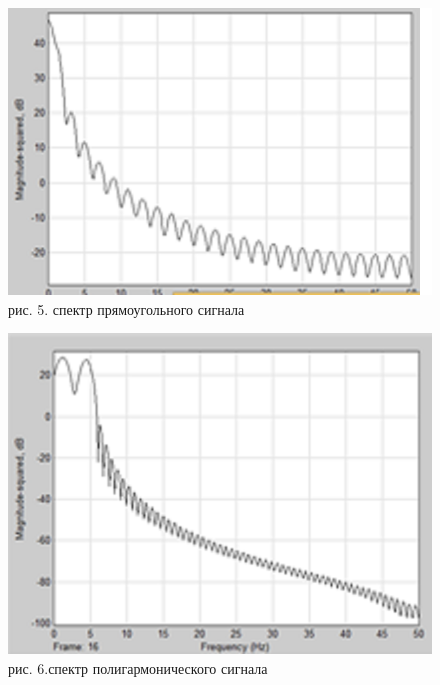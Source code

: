 \documentclass[10pt,a4paper]{report}
\begin{document}
\begin{figure}
\begin{center}
\includegraphics[angle=0, scale = 0.9]{5.png}\newline
рис. 5. спектр прямоугольного сигнала\newline
\end{center}
\end{figure}
\begin{figure}
\begin{center}
\includegraphics[angle=0, scale = 0.7]{6.png}\newline
рис. 6.спектр полигармонического сигнала\newline
\end{center}
\end{figure}
\end{document}

